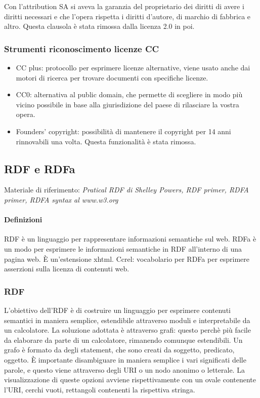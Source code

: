 Con l'attribution SA si aveva la garanzia del proprietario dei diritti di avere i diritti necessari e che l'opera rispetta i diritti d'autore, di marchio di fabbrica e altro. Questa clausola \`e stata rimossa dalla licenza 2.0 in poi.

\subsubsection{Strumenti riconoscimento licenze CC}
\begin{itemize}

\item CC plus: protocollo per esprimere licenze alternative, viene usato anche dai motori di ricerca per trovare documenti con specifiche licenze.
\item CC0: alternativa al public domain, che permette di scegliere in modo pi\`u vicino possibile in base alla giurisdizione del paese di rilasciare la vostra opera.
\item Founders' copyright: possibilit\`a di mantenere il copyright per 14 anni rinnovabili una volta. Questa funzionalit\`a \`e stata rimossa.

\end{itemize}

\subsection{RDF e RDFa}

Materiale di riferimento: \textit{Pratical RDF di Shelley Powers, RDF primer, RDFA primer, RDFA syntax al www.w3.org}

\paragraph*{Definizioni}RDF \`e un linguaggio per rappresentare informazioni semantiche sul web.
RDFa \`e un modo per esprimere le informazioni semantiche in RDF all'interno di una pagina web. \`E un'estensione xhtml.
Ccrel: vocabolario per RDFa per esprimere asserzioni sulla licenza di contenuti web.

\subsubsection{RDF}
L'obiettivo dell'RDF \`e di costruire un linguaggio per esprimere contenuti semantici in maniera semplice, estendibile attraverso moduli e interpretabile da un calcolatore.
La soluzione adottata \`e attraverso grafi: questo perch\`e pi\`u facile da elaborare da parte di un calcolatore, rimanendo comunque estendibili. Un grafo \`e formato da degli statement, che sono creati da soggetto, predicato, oggetto. \`E importante disambiguare in maniera semplice i vari significati delle parole, e questo viene attraverso degli URI o un nodo anonimo o letterale. La visualizzazione di queste opzioni avviene rispettivamente con un ovale contenente l'URI, cerchi vuoti, rettangoli contenenti la rispettiva stringa.

